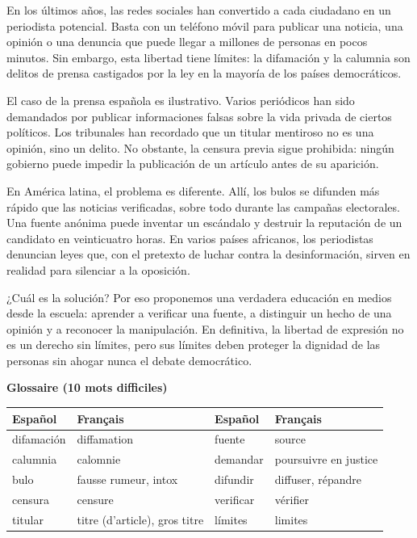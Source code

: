 \documentclass[11pt]{article}
\begin{document}
\begin{textebox}
En los últimos años, las redes sociales han convertido a cada ciudadano en un periodista potencial. Basta con un teléfono móvil para publicar una noticia, una opinión o una denuncia que puede llegar a millones de personas en pocos minutos. Sin embargo, esta libertad tiene límites: la difamación y la calumnia son delitos de prensa castigados por la ley en la mayoría de los países democráticos.

El caso de la prensa española es ilustrativo. Varios periódicos han sido demandados por publicar informaciones falsas sobre la vida privada de ciertos políticos. Los tribunales han recordado que un titular mentiroso no es una opinión, sino un delito. No obstante, la censura previa sigue prohibida: ningún gobierno puede impedir la publicación de un artículo antes de su aparición.

En América latina, el problema es diferente. Allí, los bulos se difunden más rápido que las noticias verificadas, sobre todo durante las campañas electorales. Una fuente anónima puede inventar un escándalo y destruir la reputación de un candidato en veinticuatro horas. En varios países africanos, los periodistas denuncian leyes que, con el pretexto de luchar contra la desinformación, sirven en realidad para silenciar a la oposición.

¿Cuál es la solución? Por eso proponemos una verdadera educación en medios desde la escuela: aprender a verificar una fuente, a distinguir un hecho de una opinión y a reconocer la manipulación. En definitiva, la libertad de expresión no es un derecho sin límites, pero sus límites deben proteger la dignidad de las personas sin ahogar nunca el debate democrático.
\end{textebox}

\textbf{Glossaire (10 mots difficiles)}

\begin{center}
\begin{tabularx}{\linewidth}{|l|X|l|X|}
\hline
\rowcolor{popblueL} \textbf{Español} & \textbf{Français} & \textbf{Español} & \textbf{Français} \\
\hline
difamación & diffamation & fuente & source \\
\hline
calumnia & calomnie & demandar & poursuivre en justice \\
\hline
bulo & fausse rumeur, intox & difundir & diffuser, répandre \\
\hline
censura & censure & verificar & vérifier \\
\hline
titular & titre (d'article), gros titre & límites & limites \\
\hline
\end{tabularx}
\end{center}
\end{document}
